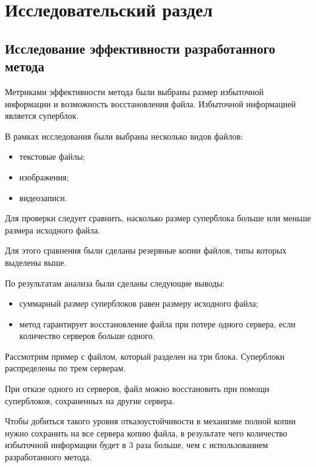\chapter{Исследовательский раздел}

\section{Исследование эффективности разработанного метода}

Метриками эффективности метода были выбраны размер избыточной информации и возможность восстановления файла. 
Избыточной информацией является суперблок.

\begin{flushleft}
В рамках исследования были выбраны несколько видов файлов:
\end{flushleft}
\begin{itemize}
\item текстовые файлы;
\item изображения;
\item видеозаписи.
\end{itemize}

Для проверки следует сравнить, насколько размер суперблока больше или меньше размера исходного файла.

Для этого сравнения были сделаны резервные копии файлов, типы которых выделены выше. 

\begin{flushleft}
По результатам анализа были сделаны следующие выводы:
\end{flushleft}
\begin{itemize}
\item суммарный размер суперблоков равен размеру исходного файла;
\item метод гарантирует восстановление файла при потере одного сервера, если количество серверов больше одного.
\end{itemize}

Рассмотрим пример с файлом, который разделен на три блока. Суперблоки распределены по трем серверам.

При отказе одного из серверов, файл можно восстановить при помощи суперблоков, сохраненных на другие сервера.

Чтобы добиться такого уровня отказоустойчивости в механизме полной копии нужно сохранить на все сервера копию файла, в результате чего количество избыточной информации будет в 3 раза больше, чем с использованием разработанного метода.  

